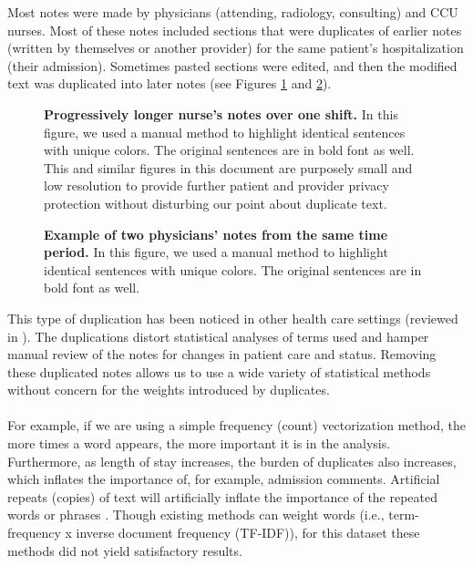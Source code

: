 \documentclass[runningheads,a4paper]{llncs}
\begin{document}
\noindent Most notes were made by physicians (attending, radiology, consulting) and CCU nurses. Most of these notes included sections that were duplicates of earlier notes (written by themselves or another provider) for the same patient’s hospitalization (their admission). Sometimes pasted sections were edited, and then the modified text was duplicated into later notes (see Figures \ref{notes1} and \ref{notes2}).

\begin{figure}
 \caption {\textbf{Progressively longer nurse’s notes over one shift.} In this figure, we used a manual method to highlight identical sentences with unique colors. The original sentences are in bold font as well. This and similar figures in this document are purposely small and low resolution to provide further patient and provider privacy protection without disturbing our point about duplicate text.}
 \label{notes1}
\end{figure}

\begin{figure}
 \caption {\textbf{ Example of two physicians’ notes from the same time period.} In this figure, we used a manual method to highlight identical sentences with unique colors. The original sentences are in bold font as well.}
 \label{notes2}
\end{figure}

\noindent This type of duplication has been noticed in other health care settings (reviewed in \cite{Dean:2018}). The duplications distort statistical analyses of terms used and hamper manual review of the notes for changes in patient care and status. Removing these duplicated notes allows us to use a wide variety of statistical methods without concern for the weights introduced by duplicates. \\
\\

\noindent For example, if we are using a simple frequency (count) vectorization method, the more times a word appears, the more important it is in the analysis. Furthermore, as length of stay increases, the burden of duplicates also increases, which inflates the importance of, for example, admission comments. Artificial repeats (copies) of text will artificially inflate the importance of the repeated words or phrases \cite{Cohen:2013}. Though existing methods can weight words (i.e., term-frequency x inverse document frequency (TF-IDF)), for this dataset these methods did not yield satisfactory results.\\
\\
\end{document}
